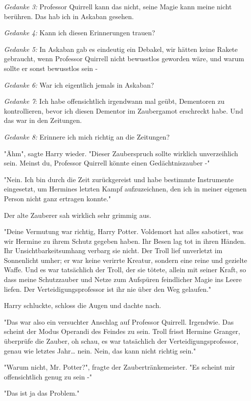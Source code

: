 {\emph{Gedanke 3:} Professor Quirrell kann das nicht, seine Magie kann meine nicht berühren. Das hab ich in Askaban gesehen.

\emph{Gedanke 4:} Kann ich diesen Erinnerungen trauen?

\emph{Gedanke 5:} In Askaban gab es eindeutig ein Debakel, wir hätten keine Rakete gebraucht, wenn Professor Quirrell nicht bewusstlos geworden wäre, und warum sollte er sonst bewusstlos sein -

\emph{Gedanke 6:} War ich eigentlich jemals in Askaban?

\emph{Gedanke 7}: Ich habe offensichtlich irgendwann mal geübt, Dementoren zu kontrollieren, bevor ich diesen Dementor im Zaubergamot erschreckt habe. Und das war in den Zeitungen.

\emph{Gedanke 8:} Erinnere ich mich richtig an die Zeitungen?

"Ähm", sagte Harry wieder. "Dieser Zauberspruch sollte wirklich unverzeihlich sein. Meinst du, Professor Quirrell könnte einen Gedächtniszauber -"

"Nein. Ich bin durch die Zeit zurückgereist und habe bestimmte Instrumente eingesetzt, um Hermines letzten Kampf aufzuzeichnen, den ich in meiner eigenen Person nicht ganz ertragen konnte."

Der alte Zauberer sah wirklich sehr grimmig aus.

"Deine Vermutung war richtig, Harry Potter. Voldemort hat alles sabotiert, was wir Hermine zu ihrem Schutz gegeben haben. Ihr Besen lag tot in ihren Händen. Ihr Unsichtbarkeitsumhang verbarg sie nicht. Der Troll lief unverletzt im Sonnenlicht umher; er war keine verirrte Kreatur, sondern eine reine und gezielte Waffe. Und es war tatsächlich der Troll, der sie tötete, allein mit seiner Kraft, so dass meine Schutzzauber und Netze zum Aufspüren feindlicher Magie ins Leere liefen. Der Verteidigungsprofessor ist ihr nie über den Weg gelaufen."

Harry schluckte, schloss die Augen und dachte nach.

"Das war also ein versuchter Anschlag auf Professor Quirrell. Irgendwie. Das scheint der Modus Operandi des Feindes zu sein. Troll frisst Hermine Granger, überprüfe die Zauber, oh schau, es war tatsächlich der Verteidigungsprofessor, genau wie letztes Jahr… nein. Nein, das kann nicht richtig sein."

"Warum nicht, Mr. Potter?", fragte der Zaubertränkemeister. "Es scheint mir offensichtlich genug zu sein -"

"Das ist ja das Problem."

}
